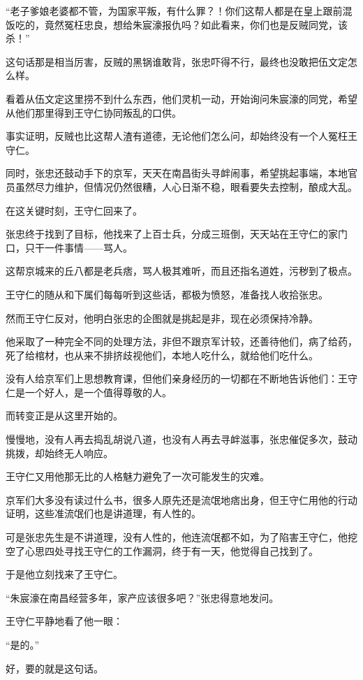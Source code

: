 \begin{multicols}{\theparacolNo}
		“老子爹娘老婆都不管，为国家平叛，有什么罪？！你们这帮人都是在皇上跟前混饭吃的，竟然冤枉忠良，想给朱宸濠报仇吗？如此看来，你们也是反贼同党，该杀！”

		这句话那是相当厉害，反贼的黑锅谁敢背，张忠吓得不行，最终也没敢把伍文定怎么样。

		看着从伍文定这里捞不到什么东西，他们灵机一动，开始询问朱宸濠的同党，希望从他们那里得到王守仁协同叛乱的口供。

		事实证明，反贼也比这帮人渣有道德，无论他们怎么问，却始终没有一个人冤枉王守仁。

		同时，张忠还鼓动手下的京军，天天在南昌街头寻衅闹事，希望挑起事端，本地官员虽然尽力维护，但情况仍然很糟，人心日渐不稳，眼看要失去控制，酿成大乱。

		在这关键时刻，王守仁回来了。

		张忠终于找到了目标，他找来了上百士兵，分成三班倒，天天站在王守仁的家门口，只干一件事情——骂人。

		这帮京城来的丘八都是老兵痞，骂人极其难听，而且还指名道姓，污秽到了极点。

		王守仁的随从和下属们每每听到这些话，都极为愤怒，准备找人收拾张忠。

		然而王守仁反对，他明白张忠的企图就是挑起是非，现在必须保持冷静。

		他采取了一种完全不同的处理方法，非但不跟京军计较，还善待他们，病了给药，死了给棺材，也从来不排挤歧视他们，本地人吃什么，就给他们吃什么。

		没有人给京军们上思想教育课，但他们亲身经历的一切都在不断地告诉他们：王守仁是一个好人，是一个值得尊敬的人。

		而转变正是从这里开始的。

		慢慢地，没有人再去捣乱胡说八道，也没有人再去寻衅滋事，张忠催促多次，鼓动挑拨，却始终无人响应。

		王守仁又用他那无比的人格魅力避免了一次可能发生的灾难。

		京军们大多没有读过什么书，很多人原先还是流氓地痞出身，但王守仁用他的行动证明，这些准流氓们也是讲道理，有人性的。

		可是张忠先生是不讲道理，没有人性的，他连流氓都不如，为了陷害王守仁，他挖空了心思四处寻找王守仁的工作漏洞，终于有一天，他觉得自己找到了。

		于是他立刻找来了王守仁。

		“朱宸濠在南昌经营多年，家产应该很多吧？”张忠得意地发问。

		王守仁平静地看了他一眼：

		“是的。”

		好，要的就是这句话。


\end{multicols}
